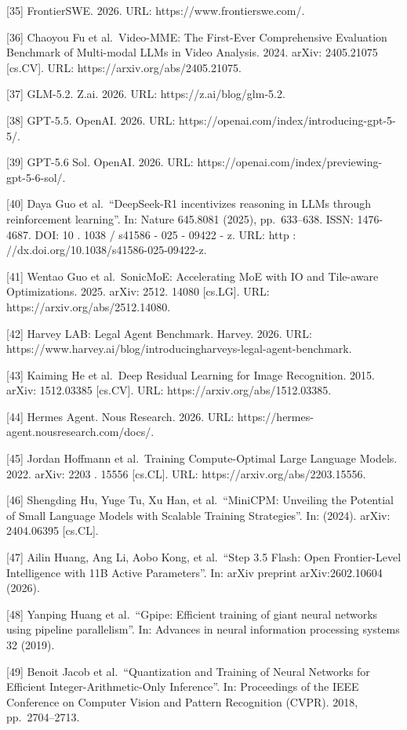 \documentclass[
  10
]{article}
\begin{document}
{[}35{]} FrontierSWE. 2026. URL: https://www.frontierswe.com/.

{[}36{]} Chaoyou Fu et al.~Video-MME: The First-Ever Comprehensive
Evaluation Benchmark of Multi-modal LLMs in Video Analysis. 2024. arXiv:
2405.21075 {[}cs.CV{]}. URL: https://arxiv.org/abs/2405.21075.

{[}37{]} GLM-5.2. Z.ai. 2026. URL: https://z.ai/blog/glm-5.2.

{[}38{]} GPT-5.5. OpenAI. 2026. URL:
https://openai.com/index/introducing-gpt-5-5/.

{[}39{]} GPT-5.6 Sol. OpenAI. 2026. URL:
https://openai.com/index/previewing-gpt-5-6-sol/.

{[}40{]} Daya Guo et al.~``DeepSeek-R1 incentivizes reasoning in LLMs
through reinforcement learning''. In: Nature 645.8081 (2025),
pp.~633--638. ISSN: 1476-4687. DOI: 10 . 1038 / s41586 - 025 - 09422 -
z. URL: http : //dx.doi.org/10.1038/s41586-025-09422-z.

{[}41{]} Wentao Guo et al.~SonicMoE: Accelerating MoE with IO and
Tile-aware Optimizations. 2025. arXiv: 2512. 14080 {[}cs.LG{]}. URL:
https://arxiv.org/abs/2512.14080.

{[}42{]} Harvey LAB: Legal Agent Benchmark. Harvey. 2026. URL:
https://www.harvey.ai/blog/introducingharveys-legal-agent-benchmark.

{[}43{]} Kaiming He et al.~Deep Residual Learning for Image Recognition.
2015. arXiv: 1512.03385 {[}cs.CV{]}. URL:
https://arxiv.org/abs/1512.03385.

{[}44{]} Hermes Agent. Nous Research. 2026. URL:
https://hermes-agent.nousresearch.com/docs/.

{[}45{]} Jordan Hoffmann et al.~Training Compute-Optimal Large Language
Models. 2022. arXiv: 2203 . 15556 {[}cs.CL{]}. URL:
https://arxiv.org/abs/2203.15556.

{[}46{]} Shengding Hu, Yuge Tu, Xu Han, et al.~``MiniCPM: Unveiling the
Potential of Small Language Models with Scalable Training Strategies''.
In: (2024). arXiv: 2404.06395 {[}cs.CL{]}.

{[}47{]} Ailin Huang, Ang Li, Aobo Kong, et al.~``Step 3.5 Flash: Open
Frontier-Level Intelligence with 11B Active Parameters''. In: arXiv
preprint arXiv:2602.10604 (2026).

{[}48{]} Yanping Huang et al.~``Gpipe: Efficient training of giant
neural networks using pipeline parallelism''. In: Advances in neural
information processing systems 32 (2019).

{[}49{]} Benoit Jacob et al.~``Quantization and Training of Neural
Networks for Efficient Integer-Arithmetic-Only Inference''. In:
Proceedings of the IEEE Conference on Computer Vision and Pattern
Recognition (CVPR). 2018, pp.~2704--2713.
\end{document}
